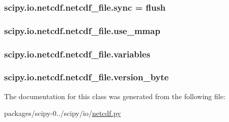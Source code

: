 \subsubsection[{sync}]{\setlength{\rightskip}{0pt plus 5cm}scipy.\+io.\+netcdf.\+netcdf\+\_\+file.\+sync = {\bf flush}\hspace{0.3cm}{\ttfamily [static]}}\label{classscipy_1_1io_1_1netcdf_1_1netcdf__file_a208e2f07e49f9734873a2e52ead72fd1}
\hypertarget{classscipy_1_1io_1_1netcdf_1_1netcdf__file_ab30b03bd27bc485d38eee32d9957fe49}{}
\subsubsection[{use\+\_\+mmap}]{\setlength{\rightskip}{0pt plus 5cm}scipy.\+io.\+netcdf.\+netcdf\+\_\+file.\+use\+\_\+mmap}\label{classscipy_1_1io_1_1netcdf_1_1netcdf__file_ab30b03bd27bc485d38eee32d9957fe49}
\hypertarget{classscipy_1_1io_1_1netcdf_1_1netcdf__file_a27345ed6ed8853159164b0d00e3369a4}{}
\subsubsection[{variables}]{\setlength{\rightskip}{0pt plus 5cm}scipy.\+io.\+netcdf.\+netcdf\+\_\+file.\+variables}\label{classscipy_1_1io_1_1netcdf_1_1netcdf__file_a27345ed6ed8853159164b0d00e3369a4}
\hypertarget{classscipy_1_1io_1_1netcdf_1_1netcdf__file_ad50eb4214bad62a9bf838037d5dada96}{}
\subsubsection[{version\+\_\+byte}]{\setlength{\rightskip}{0pt plus 5cm}scipy.\+io.\+netcdf.\+netcdf\+\_\+file.\+version\+\_\+byte}\label{classscipy_1_1io_1_1netcdf_1_1netcdf__file_ad50eb4214bad62a9bf838037d5dada96}


The documentation for this class was generated from the following file\+:\begin{DoxyCompactItemize}
\item 
packages/scipy-\/0../scipy/io/\hyperlink{netcdf_8py}{netcdf.\+py}\end{DoxyCompactItemize}

